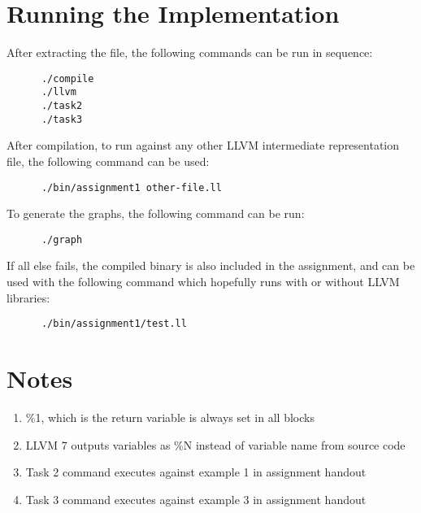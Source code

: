 \documentclass[11pt,a4paper,fleqn]{article}
\begin{document}
   \section {Running the Implementation}

   After extracting the file, the following commands can be run in sequence:

   \begin{verbatim}
      ./compile
      ./llvm
      ./task2
      ./task3
   \end{verbatim}

   After compilation, to run against any other LLVM intermediate representation file, the following command can be used:

   \begin{verbatim}
      ./bin/assignment1 other-file.ll
   \end{verbatim}

   To generate the graphs, the following command can be run:

   \begin{verbatim}
      ./graph
   \end{verbatim}

   If all else fails, the compiled binary is also included in the assignment, and can be used with the following command which hopefully runs with or without LLVM libraries:

   \begin{verbatim}
      ./bin/assignment1/test.ll
   \end{verbatim}

   \section{Notes}

   \begin{enumerate}
      \item \%1, which is the return variable is always set in all blocks
      \item LLVM 7 outputs variables as \%N instead of variable name from source code
      \item Task 2 command executes against example 1 in assignment handout
      \item Task 3 command executes against example 3 in assignment handout
   \end{enumerate}
   
\end{document}
